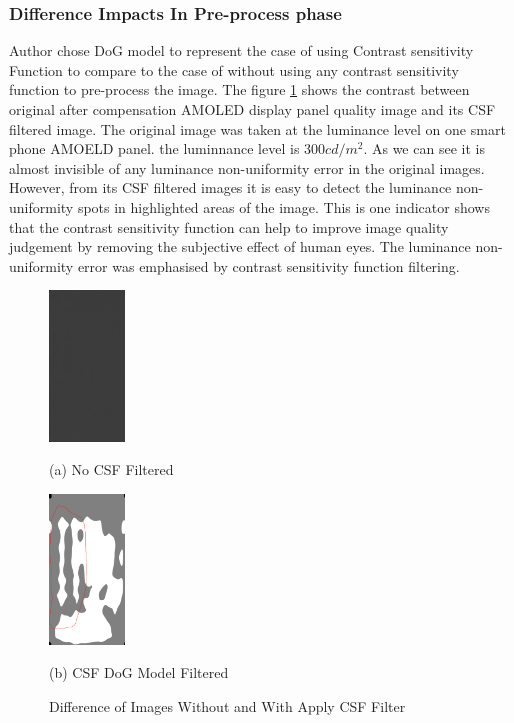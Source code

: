 \documentclass{article}
\begin{document}
\subsubsection{Difference Impacts In Pre-process phase}
Author chose DoG model to represent the case of using Contrast sensitivity Function to compare to the case of without using any contrast sensitivity function to pre-process the image.
The figure \ref{fig3} shows the contrast between  original after compensation AMOLED display panel quality image and its CSF filtered image. The original image was taken at the luminance level on one smart phone AMOELD panel. the luminnance level is $300 cd/m^2$. As we can see it is almost invisible of any luminance non-uniformity error in the original images. However, from its CSF filtered images it is easy to detect the luminance non-uniformity spots in highlighted areas of the image. This is one indicator shows that the contrast sensitivity function can help to improve image quality judgement by removing the subjective effect of human eyes. The luminance non-uniformity error was emphasised by contrast sensitivity function filtering.

\begin{figure}[h]
\begin{minipage}[b]{.48\linewidth}
  \centering
  \centerline{\includegraphics[width=2cm]{images/A1_G_300_I3_PsdLum.csv.png}}
  \centerline{(a) No CSF Filtered}\medskip
\end{minipage}
\hfill
\begin{minipage}[b]{0.48\linewidth}
  \centering
  \centerline{\includegraphics[width=2cm]{images/DoG_csfed_A1_G_300_I3_PsdLum.csv.png}}
  \centerline{(b) CSF DoG Model Filtered}\medskip
\end{minipage}
%
\caption{Difference of Images Without and With Apply CSF Filter}
\label{fig3}
%
\end{figure}
\end{document}
